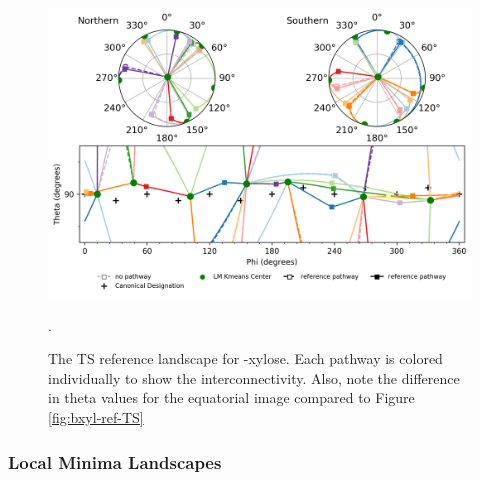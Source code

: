 \documentclass{article}
\begin{document}
\begin{figure}[H]
  	\centering
  	\includegraphics[width=\textwidth,height=\textheight,keepaspectratio]
	{figures/bxyl/z_dataset-bxyl-TS--all_groups_comp-reference.png}
	\caption{The TS reference landscape for \textbeta-xylose. Each pathway is colored individually to 
	show the interconnectivity. Also, note the difference in theta values for the equatorial image compared to Figure \ref{fig:bxyl-ref-TS}}.
 	\label{fig:bxyl-ref-TS-color}
\end{figure}



\subsubsection{Local Minima Landscapes}
\end{document}
